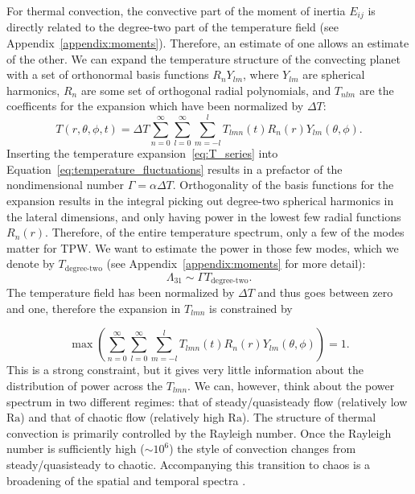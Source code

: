 \documentclass[extra,mreferee]{gji}
\begin{document}
For thermal convection, the convective part of the moment of inertia $E_{ij}$ is directly related to the degree-two part of the temperature field (see Appendix~\ref{appendix:moments}).
Therefore, an estimate of one allows an estimate of the other.
We can expand the temperature structure of the convecting planet with a set of orthonormal basis functions $R_n Y_{lm}$, 
where $Y_{lm}$ are spherical harmonics, $R_n$ are some set of orthogonal radial polynomials, and
$T_{nlm}$ are the coefficents for the expansion which have been normalized by $\Delta T$:
\begin{equation} 
T( r , \theta, \phi, t )  = \Delta T {\displaystyle \sum_{n=0}^\infty \sum_{l=0}^\infty \sum_{m=-l}^{l} } T_{lmn}(t) R_n(r) Y_{lm} (\theta , \phi).
\label{eq:T_series}
\end{equation}
Inserting the temperature expansion~\eqref{eq:T_series} into Equation~\eqref{eq:temperature_fluctuations} results in 
a prefactor of the nondimensional number $\Gamma = \alpha \Delta T$.
Orthogonality of the basis functions for the expansion results in the integral picking out degree-two 
spherical harmonics in the lateral dimensions, and only having power in the lowest few radial functions $R_n(r)$.
Therefore, of the entire temperature spectrum, only a few of the modes matter for TPW.
We want to estimate the power in those few modes, which we denote by $T_{\text{degree-two}}$ (see Appendix~\ref{appendix:moments} for more detail): 
\begin{equation}
\Lambda_{31} \sim \Gamma T_{\text{degree-two}}.
\end{equation}
The temperature field has been normalized by $\Delta T$ and thus goes between zero and one, therefore the expansion in $T_{lmn}$ is constrained by

\begin{equation}
\max \left( \displaystyle \sum_{n=0}^\infty \sum_{l=0}^\infty \sum_{m=-l}^{l} T_{lmn}(t) R_n(r) Y_{lm} (\theta , \phi) \right) = 1.
\end{equation}
This is a strong constraint, but it gives very little information about the distribution of power across the $T_{lmn}$.  
We can, however, think about the power spectrum in two different regimes: that of steady/quasisteady flow (relatively low $\mathrm{Ra}$) and that of chaotic flow (relatively high $\mathrm{Ra}$).
The structure of thermal convection is primarily controlled by the Rayleigh number.  Once the Rayleigh number is sufficiently high ($\sim10^6$) 
the style of convection changes from steady/quasisteady to chaotic.  Accompanying this transition to chaos is a broadening of the spatial 
and temporal spectra \citep{mclaughlin1982transition}.  
\end{document}
